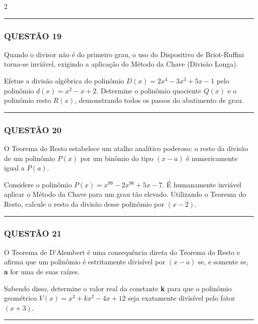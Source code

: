 \documentclass[twoside, 10pt, a4paper]{article}
\begin{document}
\begin{multicols*}{2}
\vspace{0cm} \noindent\textcolor{CorLinha}{\rule{\linewidth}{0.5pt}} \vspace{-0.2cm}
\subsubsection*{QUESTÃO 19}

Quando o divisor não é do primeiro grau, o uso do Dispositivo de Briot-Ruffini torna-se inviável, exigindo a aplicação do Método da Chave (Divisão Longa). 

Efetue a divisão algébrica do polinômio $ D(x) = 2x^4 - 3x^3 + 5x - 1 $ pelo polinômio $ d(x) = x^2 - x + 2 $. Determine o polinômio quociente $ Q(x) $ e o polinômio resto $ R(x) $, demonstrando todos os passos do abatimento de grau.

\vspace{0cm} \noindent\textcolor{CorLinha}{\rule{\linewidth}{0.5pt}} \vspace{-0.2cm}
\subsubsection*{QUESTÃO 20}

O Teorema do Resto estabelece um atalho analítico poderoso: o resto da divisão de um polinômio $ P(x) $ por um binômio do tipo $ (x - a) $ é numericamente igual a $ P(a) $.

Considere o polinômio $ P(x) = x^{99} - 2x^{98} + 5x - 7 $. É humanamente inviável aplicar o Método da Chave para um grau tão elevado. Utilizando o Teorema do Resto, calcule o resto da divisão desse polinômio por $ (x - 2) $.

\vspace{0cm} \noindent\textcolor{CorLinha}{\rule{\linewidth}{0.5pt}} \vspace{-0.2cm}
\subsubsection*{QUESTÃO 21}

O Teorema de D'Alembert é uma consequência direta do Teorema do Resto e afirma que um polinômio é estritamente divisível por $ (x - a) $ se, e somente se, \textbf{a} for uma de suas raízes. 

Sabendo disso, determine o valor real da constante \textbf{k} para que o polinômio geométrico $ V(x) = x^3 + kx^2 - 4x + 12 $ seja exatamente divisível pelo fator $ (x + 3) $.

\vspace{0cm} \noindent\textcolor{CorLinha}{\rule{\linewidth}{0.5pt}} \vspace{-0.2cm}

\end{multicols*}
\end{document}
